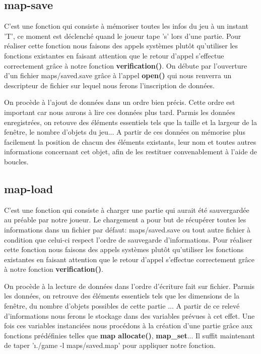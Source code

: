 \documentclass{article}
\begin{document}
	\subsection{map-save}
	C'est une fonction qui consiste \`{a} m\'emoriser toutes les infos du jeu \`{a} un instant 'T', ce moment est d\'eclench\'e quand le joueur tape 's' lors d'une partie. Pour r\'ealiser cette fonction nous faisons des appels syst\`{e}mes plut\^ot qu'utiliser les fonctions existantes en faisant attention que le retour d'appel s'effectue correctement gr\^ace \`a notre fonction \textbf{verification()}. On d\'ebute par l'ouverture d'un fichier maps/saved.save gr\^ace \`a l'appel \textbf{open()} qui nous renverra un descripteur de fichier sur lequel nous ferons l'inscription de donn\'ees.

        On proc\`{e}de \`a l'ajout de donn\'ees dans un ordre bien pr\'ecis. Cette ordre est important car nous aurons \`a lire ces donn\'ees plus tard. Parmis les donn\'ees enregistr\'ees, on retouve des \'el\'ements essentiels tels que la taille et la largeur de la fen\^etre, le nombre d'objets du jeu... A partir de ces donn\'ees on m\'emorise plus facilement la position de chacun des \'el\'ements existants, leur nom et toutes autres informations concernant cet objet, afin de les restituer convenablement \`a l'aide de boucles.

        
	\subsection{map-load}
	C'est une fonction qui consiste \`{a} charger une partie qui aurait \'et\'e sauvergard\'ee au pr\'eable par notre joueur. Le chargement a pour but de r\'ecup\'erer toutes les informations dans un fichier par d\'efaut: maps/saved.save ou tout autre fichier \`a condition que celui-ci respect l'ordre de sauvegarde d'informations. Pour r\'ealiser cette fonction nous faisons des appels syst\`{e}mes plut\^ot qu'utiliser les fonctions existantes en faisant attention que le retour d'appel s'effectue correctement gr\^ace \`a notre fonction \textbf{verification()}.

        On proc\`ede \`a la lecture de donn\'ees dans l'ordre d'\'ecriture fait sur fichier. Parmis les donn\'ees, on retrouve des \'el\'ements essentiels tels que les dimensions de la fen\^etre, du nombre d'objets possibles de cette partie ... A partir de ce relev\'e d'informations nous ferons le stockage dans des variables pr\'evues \`a cet effet. Une fois ces variables instanci\'ees nous proc\'edons \`a la cr\'eation d'une partie gr\^ace aux fonctions pr\'ed\'efinies telles que \textbf{map allocate()}, \textbf{map\_set}... Il suffit maintenant de taper '\i{./game -l maps/saved.map}' pour appliquer notre fonction.
\end{document}
